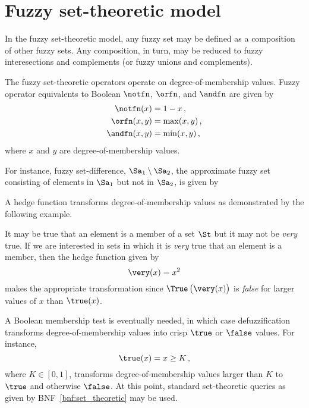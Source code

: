 \documentclass[ ../main.tex]{subfiles}
\begin{document}
\section{Fuzzy set-theoretic model}
In the fuzzy set-theoretic model, any fuzzy set may be defined as a composition of other fuzzy sets. Any composition, in turn, may be reduced to fuzzy interesections and complements (or fuzzy unions and complements).

The fuzzy set-theoretic operators operate on degree-of-membership values. Fuzzy operator equivalents to Boolean $\notfn$, $\orfn$, and $\andfn$ are given by
\begin{align}
    \notfn(x) &= 1 - x\,,\\
    \orfn(x, y) &= \max(x, y)\,,\\
    \andfn(x, y) &= \min(x, y)\,,
\end{align}
where $x$ and $y$ are degree-of-membership values.


For instance, fuzzy set-difference, $\Sa_1 \setminus \Sa_2$, the approximate fuzzy set consisting of elements in $\Sa_1$ but not in $\Sa_2$, is given by
\begin{equation}
    
\end{equation}


A hedge function transforms degree-of-membership values as demonstrated by the following example.
\begin{example}
It may be true that an element is a member of a set $\St$ but it may not be \emph{very} true. If we are interested in sets in which it is \emph{very} true that an element is a member, then the hedge function given by
\begin{equation}
    \very(x) = x^2
\end{equation}
makes the appropriate transformation since $\True\left(\very(x)\right)$ is \emph{false} for larger values of $x$ than $\true(x)$.
\end{example}

A Boolean membership test is eventually needed, in which case defuzzification transforms degree-of-membership values into crisp $\true$ or $\false$ values. For instance,
\begin{equation}
    \true(x) = x \geq K\,,
\end{equation}
where $K \in [0,1]$, transforms degree-of-membership values larger than $K$ to $\true$ and otherwise $\false$. At this point, standard set-theoretic queries as given by BNF~\ref{bnf:set_theoretic} may be used.
\end{document}
